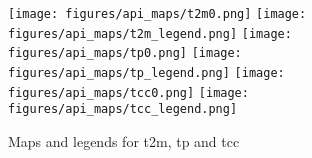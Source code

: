 \begin{figure}[!ht]
\centering
\texttt{[image: figures/api\_maps/t2m0.png]}
\texttt{[image: figures/api\_maps/t2m\_legend.png]}
\texttt{[image: figures/api\_maps/tp0.png]}
\texttt{[image: figures/api\_maps/tp\_legend.png]}
\texttt{[image: figures/api\_maps/tcc0.png]}
\texttt{[image: figures/api\_maps/tcc\_legend.png]}
\caption{Maps and legends for t2m, tp and tcc}
\label{fig:api_maps}
\end{figure}